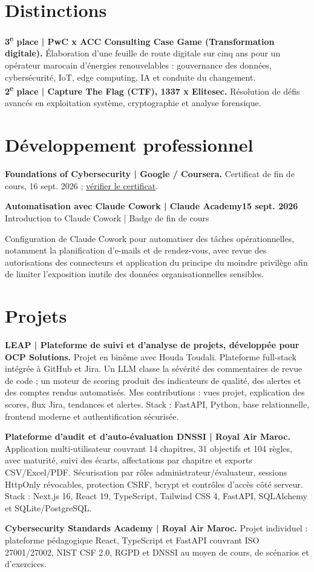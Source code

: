 \documentclass[10pt,a4paper]{article}
\newcommand{\CVEntry}[4]{%
  \textbf{#1}\hfill\textbf{#2}\\[-1pt]
  \textcolor{Quiet}{#3}\hfill\textcolor{Quiet}{#4}\par
}
\newcommand{\Project}[2]{\textbf{#1} #2\par}
\begin{document}
\section*{Distinctions}
\textbf{3\textsuperscript{e} place | PwC x ACC Consulting Case Game (Transformation digitale).}
\'Elaboration d'une feuille de route digitale sur cinq ans pour un op\'erateur marocain d'\'energies renouvelables : gouvernance des donn\'ees, cybers\'ecurit\'e, IoT, edge computing, IA et conduite du changement.\\[-1pt]
\textbf{2\textsuperscript{e} place | Capture The Flag (CTF), 1337 x Elitesec.}
R\'esolution de d\'efis avanc\'es en exploitation syst\`eme, cryptographie et analyse forensique.

\section*{D\'eveloppement professionnel}
\textbf{Foundations of Cybersecurity | Google / Coursera.} Certificat de fin de cours, 16 sept. 2026 ; \href{https://coursera.org/verify/DJ57Z0D29JGE}{v\'erifier le certificat}.\par
\CVEntry{Automatisation avec Claude Cowork | Claude Academy}{15 sept. 2026}{Introduction to Claude Cowork | Badge de fin de cours}{}
Configuration de Claude Cowork pour automatiser des t\^aches op\'erationnelles, notamment la planification d'e-mails et de rendez-vous, avec revue des autorisations des connecteurs et application du principe du moindre privil\`ege afin de limiter l'exposition inutile des donn\'ees organisationnelles sensibles.

\section*{Projets}
\Project{LEAP | Plateforme de suivi et d'analyse de projets, d\'evelopp\'ee pour OCP Solutions.}{Projet en bin\^ome avec Houda Toudali. Plateforme full-stack int\'egr\'ee \`a GitHub et Jira. Un LLM classe la s\'ev\'erit\'e des commentaires de revue de code ; un moteur de scoring produit des indicateurs de qualit\'e, des alertes et des comptes rendus automatis\'es. Mes contributions : vues projet, explication des scores, flux Jira, tendances et alertes. Stack : FastAPI, Python, base relationnelle, frontend moderne et authentification s\'ecuris\'ee.}
\vspace{1pt}
\Project{Plateforme d'audit et d'auto-\'evaluation DNSSI | Royal Air Maroc.}{Application multi-utilisateur couvrant 14 chapitres, 31 objectifs et 104 r\`egles, avec maturit\'e, suivi des \'ecarts, affectations par chapitre et exports CSV/Excel/PDF. S\'ecurisation par r\^oles administrateur/\'evaluateur, sessions HttpOnly r\'evocables, protection CSRF, bcrypt et contr\^oles d'acc\`es c\^ot\'e serveur. Stack : Next.js 16, React 19, TypeScript, Tailwind CSS 4, FastAPI, SQLAlchemy et SQLite/PostgreSQL.}
\vspace{1pt}
\Project{Cybersecurity Standards Academy | Royal Air Maroc.}{Projet individuel : plateforme p\'edagogique React, TypeScript et FastAPI couvrant ISO 27001/27002, NIST CSF 2.0, RGPD et DNSSI au moyen de cours, de sc\'enarios et d'exercices.}
\end{document}
